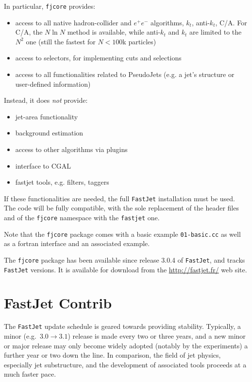 \documentclass[12pt,a4]{article}
\newcommand{\fastjet}{\texttt{FastJet}\xspace}
\newcommand{\fjcore}{\texttt{fjcore}\xspace}
\newcommand{\ttt}[1]{{\small\texttt{#1}}}
\begin{document}
In particular, \ttt{fjcore} provides:
\begin{itemize}
\item access to all native hadron-collider and $e^+e^-$ algorithms,
  $k_t$, anti-$k_t$, C/A.  For C/A, the $N\ln N$ method is available,
  while anti-$k_t$ and $k_t$ are limited to the $N^2$ one (still the
  fastest for $N < 100$k particles)
  \item access to selectors, for implementing cuts and selections
  \item access to all functionalities related to PseudoJets (e.g. a jet's
    structure or user-defined information)
\end{itemize}
Instead, it does \emph{not} provide:
\begin{itemize}
  \item jet-area functionality
  \item background estimation
  \item access to other algorithms via plugins
  \item interface to CGAL
  \item fastjet tools, e.g. filters, taggers
\end{itemize}
%
If these functionalities are needed, the full \fastjet installation must be
used. The code will be fully compatible, with the sole replacement of the
header files and of the \ttt{fjcore} namespace with the \ttt{fastjet} one.

Note that the \fjcore package comes with a basic example
\ttt{01-basic.cc} as well as a fortran interface and an associated
example.

The \fjcore package has been available since release 3.0.4 of
\fastjet, and tracks \fastjet versions.
%
It is available for download from the \url{http://fastjet.fr/} web
site.


\section{FastJet Contrib}
\label{sec:fjcontrib}

The \fastjet update schedule is geared towards providing stability.
%
Typically, a minor (e.g.\ $3.0 \to 3.1$) release is made every two or
three years, and a new minor or major release may only become widely
adopted (notably by the experiments) a further year or two down the
line.
%
In comparison, the field of jet physics, especially jet substructure,
and the development of associated tools proceeds at a much faster pace.
\end{document}
